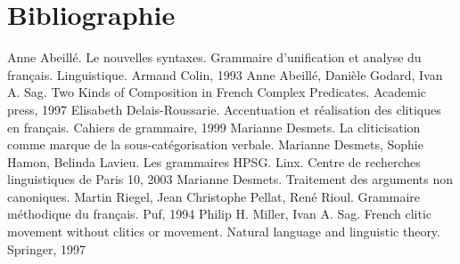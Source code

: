 \section{Bibliographie}

\begin{thebibliography}{}

\bibitem[Abe93]{} Anne Abeillé. Le nouvelles syntaxes. Grammaire d'unification et analyse du français. Linguistique. Armand Colin, 1993
\bibitem[Abe97]{} Anne Abeillé, Danièle Godard, Ivan A. Sag. Two Kinds of Composition in French Complex Predicates. Academic press, 1997
\bibitem[Del99]{} Elisabeth Delais-Roussarie. Accentuation et réalisation des clitiques en français. Cahiers de grammaire, 1999
\bibitem[DesC]{} Marianne Desmets. La cliticisation comme marque de la sous-catégorisation verbale.
\bibitem[Des03]{} Marianne Desmets, Sophie Hamon, Belinda Lavieu. Les grammaires HPSG. Linx. Centre de recherches linguistiques de Paris 10, 2003
\bibitem[DesT]{} Marianne Desmets. Traitement des arguments non canoniques.
\bibitem[Rie94]{} Martin Riegel, Jean Christophe Pellat, René Rioul. Grammaire méthodique du français. Puf, 1994
\bibitem[Mil97]{} Philip H. Miller, Ivan A. Sag. French clitic movement without clitics or movement. Natural language and linguistic theory. Springer, 1997

\end{thebibliography}

